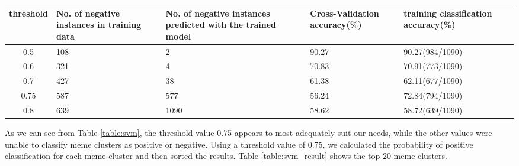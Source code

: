 \documentclass{sig-alternate}
\begin{document}
\begin{table*}[h!b!p!]
\begin{center}
\begin{tabular}{|c|p{3.0cm}|p{3.0cm}|p{3.0cm}|p{3.0cm}|p{3.0cm}|}
\hline
threshold&No. of negative instances in training data&No. of negative instances predicted with the trained model&Cross-Validation accuracy(\%)&training classification accuracy(\%)\\
\hline
0.5&108&2&90.27&90.27(984/1090)\\
0.6&321&4&70.83&70.91(773/1090)\\
0.7&427&38&61.38&62.11(677/1090)\\
0.75&587&577&56.24&72.84(794/1090)\\
0.8&639&1090&58.62&58.72(639/1090)\\
\hline
\end{tabular}
\caption{Classification experiment using SVM}
\label{table:svm}
\end{center}
\end{table*}

As we can see from Table \ref{table:svm}, the threshold value 0.75 appears to most adequately suit our needs, while the other values were unable to classify meme clusters as positive or negative. Using a threshold value of  0.75, we calculated the probability of positive classification for each meme cluster and then sorted the results. Table \ref{table:svm_result} shows the top 20 meme clusters.
\end{document}
